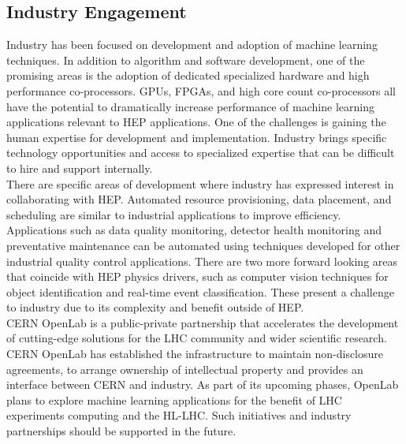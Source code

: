 
\subsection{Industry Engagement}
Industry has been focused on development and adoption of machine learning techniques. In addition to algorithm and software development, one of the promising areas is the adoption of dedicated specialized hardware and high performance co-processors. GPUs, FPGAs, and high core count co-processors all have the potential to dramatically increase performance of machine learning applications relevant to HEP applications.
One of the challenges is gaining the human expertise for development and implementation. Industry brings specific technology opportunities and access to specialized expertise that can be difficult to hire and support internally.\\

There are specific areas of development where industry has expressed interest in collaborating with HEP.  Automated resource provisioning, data placement, and scheduling are similar to industrial applications to improve efficiency. Applications such as data quality monitoring, detector health monitoring and preventative maintenance can be automated using techniques developed for other industrial quality control applications. There are two more forward looking areas that coincide with HEP physics drivers, such as computer vision techniques for object identification and real-time event classification. These present a challenge to industry due to its complexity and benefit outside of HEP.\\


CERN OpenLab is a public-private partnership that accelerates the development of cutting-edge solutions for the LHC community and wider scientific research. CERN OpenLab has established the infrastructure to maintain non-disclosure agreements, to arrange ownership of intellectual property and provides an interface between CERN and industry. As part of its upcoming phases, OpenLab plans to explore machine learning applications for the benefit of LHC experiments computing and the HL-LHC. Such initiatives and industry partnerships should be supported in the future.

